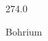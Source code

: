 \documentclass[12pt]{article}
\begin{document}
\hfill{}
\vfill
\begin{center}
  {\fontsize{50}{60}
  }

  \vspace{1em}

  274.0

Bohrium
\end{center}
\vfill
\end{document}
